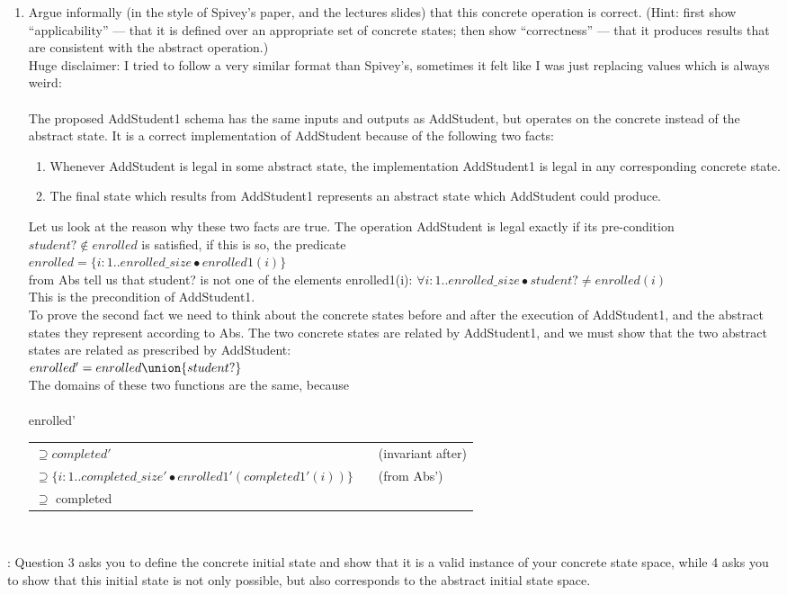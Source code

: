 \documentclass{article}
\begin{document}
\begin{enumerate}
\item Argue informally (in the style of Spivey's paper, and the
lectures slides) that this concrete operation is correct. ({\sc Hint}:
first show ``applicability'' --- that it is defined over an
appropriate set of concrete states; then show ``correctness'' --- that it produces
results that are consistent with the abstract operation.) \\
\color{blue}
Huge disclaimer: I tried to follow a very similar format than Spivey's, sometimes it felt like I was just replacing values which is always weird: \\
\\
The proposed AddStudent1 schema has the same inputs and outputs as AddStudent, but operates on the concrete instead of the abstract state. It is a correct implementation of AddStudent because of the following two facts:
\begin{enumerate}
\item Whenever AddStudent is legal in some abstract state, the implementation AddStudent1 is legal in any corresponding concrete state.
\item The final state which results from AddStudent1 represents an abstract state which AddStudent could produce.
\end{enumerate}
Let us look at the reason why these two facts are true. The operation AddStudent is legal exactly if its pre-condition $student? \notin enrolled$ is satisfied, if this is so, the predicate \\
$enrolled = \{i:1..enrolled\_size \bullet enrolled1(i)\}$ \\
from Abs tell us that student? is not one of the elements enrolled1(i):
$\forall i:1..enrolled\_size \bullet student? \neq enrolled(i)$ \\
This is the precondition of AddStudent1. \\
To prove the second fact we need to think about the concrete states before and after the execution of AddStudent1, and the abstract states they represent according to Abs. The two concrete states are related by AddStudent1, and we must show that the two abstract states are related as prescribed by AddStudent: \\
$enrolled' = enrolled \union \{student?\}$ \\

The domains of these two functions are the same, because \\
\\
enrolled'\\
\begin{tabular}{lll}
$\supseteq completed'$ & & (invariant after)\\
$\supseteq \{i:1..completed\_size' \bullet enrolled1'(completed1'(i))\}$ & & (from Abs') \\
$\supseteq$ completed \\ 
\end{tabular}
\\

\end{enumerate}

\color{black}

: Question 3 asks you to define the concrete initial state and show that it is a valid instance of your concrete state space, while 4 asks you to show that this initial state is not only possible, but also corresponds to the abstract initial state space.
\end{document}
